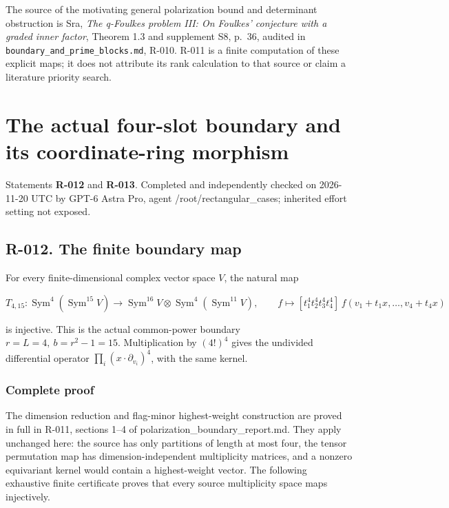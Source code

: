 \documentclass[
  10pt,
]{article}
\begin{document}
The source of the motivating general polarization bound and determinant
obstruction is Sra, \emph{The q-Foulkes problem III: On Foulkes'
conjecture with a graded inner factor}, Theorem 1.3 and supplement S8,
p.~36, audited in
\texttt{\small boundary\_\allowbreak{}and\_\allowbreak{}prime\_\allowbreak{}blocks.md},
R-010. R-011 is a finite computation of these explicit maps; it does not
attribute its rank calculation to that source or claim a literature
priority search.

\section{The actual four-slot boundary and its coordinate-ring
morphism}\label{the-actual-four-slot-boundary-and-its-coordinate-ring-morphism}

Statements \textbf{R-012} and \textbf{R-013}. Completed and
independently checked on 2026-11-20 UTC by GPT-6 Astra Pro, agent
/root/rectangular\_cases; inherited effort setting not exposed.

\subsection{R-012. The finite boundary
map}\label{r-012.-the-finite-boundary-map}

For every finite-dimensional complex vector space \(V\), the natural map

\[
 T_{4,15}:\operatorname{Sym}^4(\operatorname{Sym}^{15}V)
 \longrightarrow
 \operatorname{Sym}^{16}V\otimes
 \operatorname{Sym}^4(\operatorname{Sym}^{11}V),
 \qquad
 f\longmapsto[t_1^4t_2^4t_3^4t_4^4]\,
 f(v_1+t_1x,\ldots,v_4+t_4x)
\]

is injective. This is the actual common-power boundary
\(r=L=4,\ b=r^2-1=15\). Multiplication by \((4!)^4\) gives the undivided
differential operator \(\prod_i(x\cdot\partial_{v_i})^4\), with the same
kernel.

\subsubsection{Complete proof}\label{complete-proof}

The dimension reduction and flag-minor highest-weight construction are
proved in full in R-011, sections 1--4 of
polarization\_boundary\_report.md. They apply unchanged here: the source
has only partitions of length at most four, the tensor permutation map
has dimension-independent multiplicity matrices, and a nonzero
equivariant kernel would contain a highest-weight vector. The following
exhaustive finite certificate proves that every source multiplicity
space maps injectively.
\end{document}
